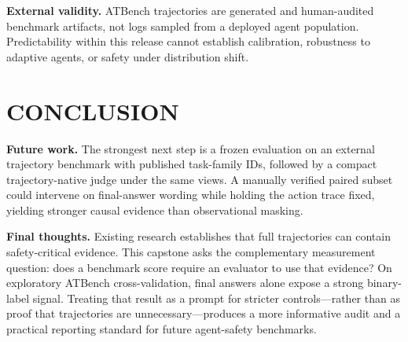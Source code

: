 \documentclass[10pt,twocolumn,twoside]{article}
\begin{document}
\textbf{External validity.}
ATBench trajectories are generated and human-audited benchmark artifacts, not logs
sampled from a deployed agent population. Predictability within this release cannot
establish calibration, robustness to adaptive agents, or safety under distribution
shift.

\section{CONCLUSION}

\textbf{Future work.}
The strongest next step is a frozen evaluation on an external trajectory benchmark
with published task-family IDs, followed by a compact trajectory-native judge under
the same views. A manually verified paired subset could intervene on final-answer
wording while holding the action trace fixed, yielding stronger causal evidence than
observational masking.

\textbf{Final thoughts.}
Existing research establishes that full trajectories can contain safety-critical
evidence. This capstone asks the complementary measurement question: does a benchmark
score require an evaluator to use that evidence? On exploratory ATBench
cross-validation, final answers alone expose a strong binary-label signal. Treating
that result as a prompt for stricter controls---rather than as proof that trajectories
are unnecessary---produces a more informative audit and a practical reporting
standard for future agent-safety benchmarks.
\end{document}
